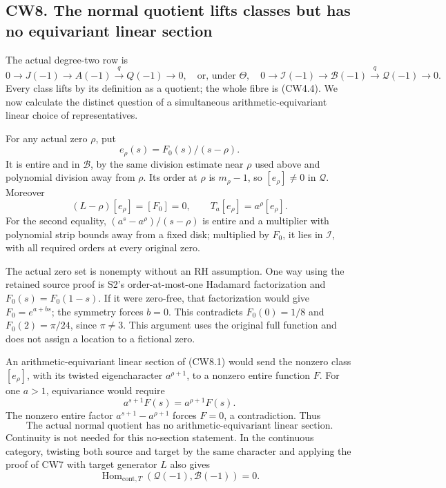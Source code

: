 \subsection{CW8. The normal quotient lifts classes but has no
equivariant linear
section}\label{cw8.-the-normal-quotient-lifts-classes-but-has-no-equivariant-linear-section}

The actual degree-two row is \[
0\to J(-1)\to A(-1)\xrightarrow{q}Q(-1)\to0,
\quad\text{or, under }\Theta,\quad
0\to\mathcal I(-1)\to\mathcal B(-1)
\xrightarrow{q}\mathcal Q(-1)\to0.
\tag{CW8.1}
\] Every class lifts by its definition as a quotient; the whole fibre is
(CW4.4). We now calculate the distinct question of a simultaneous
arithmetic-equivariant linear choice of representatives.

For any actual zero \(\rho\), put \[
e_\rho(s)=F_0(s)/(s-\rho).
\tag{CW8.2}
\] It is entire and in \(\mathcal B\), by the same division estimate
near \(\rho\) used above and polynomial division away from \(\rho\). Its
order at \(\rho\) is \(m_\rho-1\), so \([e_\rho]\ne0\) in
\(\mathcal Q\). Moreover \[
(L-\rho)[e_\rho]=[F_0]=0,\qquad
T_a[e_\rho]=a^\rho[e_\rho].
\tag{CW8.3}
\] For the second equality, \((a^s-a^\rho)/(s-\rho)\) is entire and a
multiplier with polynomial strip bounds away from a fixed disk;
multiplied by \(F_0\), it lies in \(\mathcal I\), with all required
orders at every original zero.

The actual zero set is nonempty without an RH assumption. One way using
the retained source proof is S2's order-at-most-one Hadamard
factorization and \(F_0(s)=F_0(1-s)\). If it were zero-free, that
factorization would give \(F_0=e^{a+bs}\); the symmetry forces \(b=0\).
This contradicts \(F_0(0)=1/8\) and \(F_0(2)=\pi/24\), since
\(\pi\ne3\). This argument uses the original full function and does not
assign a location to a fictional zero.

An arithmetic-equivariant linear section of (CW8.1) would send the
nonzero class \([e_\rho]\), with its twisted eigencharacter
\(a^{\rho+1}\), to a nonzero entire function \(F\). For one \(a>1\),
equivariance would require \[
a^{s+1}F(s)=a^{\rho+1}F(s).
\tag{CW8.4}
\] The nonzero entire factor \(a^{s+1}-a^{\rho+1}\) forces \(F=0\), a
contradiction. Thus \[
\boxed{\text{The actual normal quotient has no arithmetic-equivariant
linear section.}}
\tag{CW8.5}
\] Continuity is not needed for this no-section statement. In the
continuous category, twisting both source and target by the same
character and applying the proof of CW7 with target generator \(L\) also
gives \[
\operatorname{Hom}_{\mathrm{cont},T}
(\mathcal Q(-1),\mathcal B(-1))=0.
\tag{CW8.6}
\]

